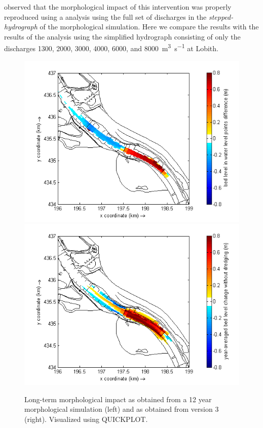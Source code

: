 \citet{GiriJagers2022} observed that the morphological impact of this intervention was properly reproduced using a \dfmi analysis using the full set of discharges in the \emph{stepped-hydrograph} of the morphological simulation.
Here we compare the results with the results of the \dfmi analysis using the simplified hydrograph consisting of only the discharges 1300, 2000, 3000, 4000, 6000, and \SI{8000}{\metre\cubed\per\second} at Lobith.

\begin{figure}[b]
\includegraphics[width=\columnwidth/2]{figures/Pannerden_delft3d.png}
\includegraphics[width=\columnwidth/2]{figures/Pannerden_dfastmi.png}
\caption{Long-term morphological impact as obtained from a 12 year morphological simulation (left) and as obtained from \dfmi version 3 (right).
Visualized using QUICKPLOT.}
\label{Pannerden_mor}
\end{figure}

